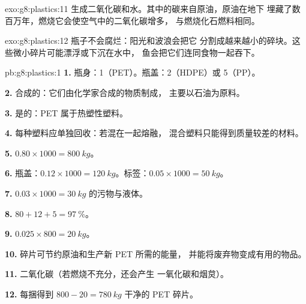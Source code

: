 \begin{solution}{exo:g8:plastics:11}
生成二氧化碳和水。其中的碳来自原油，原油在地下
埋藏了数百万年，燃烧它会使空气中的二氧化碳增多，
与燃烧化石燃料相同。
\end{solution}

\begin{solution}{exo:g8:plastics:12}
瓶子不会腐烂：阳光和波浪会把它
分割成越来越小的碎块。这些微小碎片可能漂浮或下沉在水中，
鱼会把它们连同食物一起吞下。
\end{solution}

\begin{solution}{pb:g8:plastics:1}
\textbf{1.} 瓶身：1（PET）。瓶盖：2（HDPE）或 5（PP）。

\textbf{2.} 合成的：它们由化学家合成的物质制成，
主要以石油为原料。

\textbf{3.} 是的：PET 属于热塑性塑料。

\textbf{4.} 每种塑料应单独回收：若混在一起熔融，
混合塑料只能得到质量较差的材料。

\textbf{5.} $0.80 \times 1000 = \qty{800}{kg}$。

\textbf{6.} 瓶盖：$0.12 \times 1000 = \qty{120}{kg}$。标签：$0.05
\times 1000 = \qty{50}{kg}$。

\textbf{7.} $0.03 \times 1000 = \qty{30}{kg}$ 的污物与液体。

\textbf{8.} $80 + 12 + 5 = \qty{97}{\percent}$。

\textbf{9.} $0.025 \times 800 = \qty{20}{kg}$。

\textbf{10.} 碎片可节约原油和生产新 PET 所需的能量，
并能将废弃物变成有用的物品。

\textbf{11.} 二氧化碳（若燃烧不充分，还会产生
一氧化碳和烟炱）。

\textbf{12.} 每捆得到 $800 - 20 = \qty{780}{kg}$ 干净的 PET 碎片。
\end{solution}
